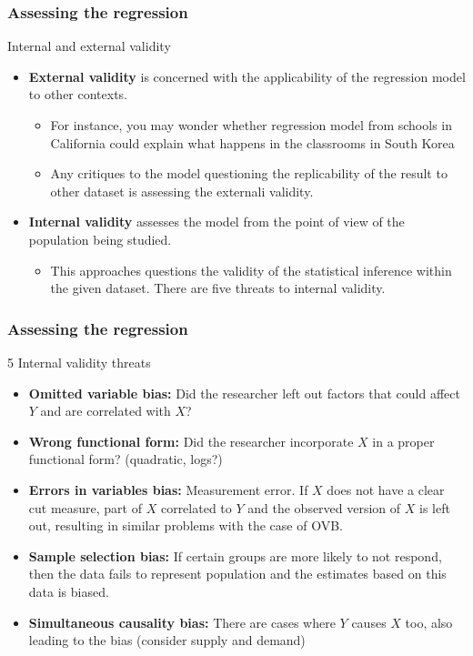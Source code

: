 \documentclass[compress]{beamer}
\begin{document}
\begin{frame}
\frametitle{Assessing the regression}
Internal and external validity
\begin{itemize}
\item \textbf{External validity} is concerned with the applicability of the regression model to other contexts. 
\begin{itemize}
\item For instance, you may wonder whether regression model from schools in California could explain what happens in the classrooms in South Korea
\item Any critiques to the model questioning the replicability of the  result to other dataset is assessing the externali validity. 
\end{itemize}
\item \textbf{Internal validity} assesses the model from the point of view of the population being studied. 
\begin{itemize}
\item This approaches questions the validity of the statistical inference within the given dataset. There are five threats to internal validity.
\end{itemize}
\end{itemize}
\end{frame}

\begin{frame}
\frametitle{Assessing the regression}
5 Internal validity threats
\begin{itemize}
\item \textbf{Omitted variable bias: } Did the researcher left out factors that could affect $Y$ and are correlated with $X$? 
\item \textbf{Wrong functional form: } Did the researcher incorporate $X$ in a proper functional form? (quadratic, logs?)
\item \textbf{Errors in variables bias: } Measurement error. If $X$ does not have a clear cut measure, part of $X$ correlated to $Y$ and the observed version of $X$ is left out, resulting in similar problems with the case of OVB.
\item \textbf{Sample selection bias: }  If certain groups are more likely to not respond, then the data fails to represent population and the estimates based on this data is biased.
\item \textbf{Simultaneous causality bias: } There are cases where $Y$ causes $X$ too, also leading to the bias (consider supply and demand)
\end{itemize}
\end{frame}
\end{document}
